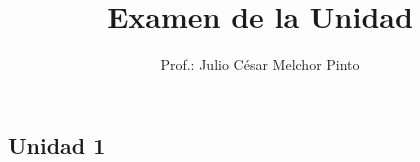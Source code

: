 \documentclass[12pt,addpoints]{evalua}
\title{Examen de la Unidad}
\author{Prof.: Julio César Melchor Pinto}
\begin{document}
\tableofcontents
\newpage%
\begin{questions}
   \section*{Unidad 1}
   \question[10]

\end{questions}
\end{document}
